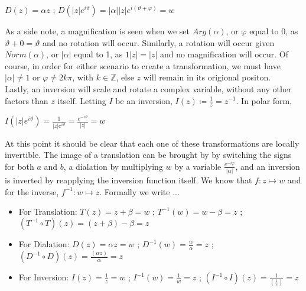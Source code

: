 \documentclass[a4paper,man,natbib]{apa6}
\newcommand{\Z}{\mathbb{Z}}  %
\begin{document}
\begin{center}

      $ D(z) = \alpha z $ ; $ D(|z|e^{i\vartheta}) = |\alpha ||z|e^{i(\vartheta + \varphi)} = w $ 

\end{center}

As a side note, a magnification is seen when we set $ Arg(\alpha) $, or $ \varphi $ equal to 0, as $ \vartheta + 0 = \vartheta $ and no rotation will occur.
Similarly, a rotation will occur given $ Norm(\alpha) $, or $ |\alpha| $ equal to 1, as $ 1|z| = |z| $ and no magnification will occur.
Of course, in order for either scenario to create a transformation, we must have $ |\alpha| \neq 1 $ or $ \varphi \neq 2k\pi $, with $ k \in \Z $, else $ z $ will remain in its origional positon.
\\
Lastly, an inversion will scale and rotate a complex variable, without any other factors than $ z $ itself.
Letting $ I $ be an inversion, $ I(z) \coloneqq \frac{1}{z} = z^{-1}$. In polar form, 

\begin{center}

      $ I(|z|e^{i\vartheta}) = \frac{1}{|z|e^{i\vartheta}} = \frac{e^{-i\vartheta}}{|z|} = w $ 

\end{center}

At this point it should be clear that each one of these transformations are locally invertible. 
The image of a translation can be brought by by switching the signs for both $ a $ and $ b $, 
a dialation by multiplying $ w $ by a variable $ \frac{e^{-i\varphi}}{|\alpha|} $, and an inversion is inverted by reapplying the inversion function itself.
We know that $ f : z \mapsto w $ and for the inverse, $  f^{-1}: w \mapsto z $. Formally we write ... 

\begin{itemize}

      \item For Translation: $ T(z) = z + \beta = w $ ; $ T^{-1}(w) = w - \beta = z $ ; $ (T^{-1} \circ  T)(z) = (z + \beta) - \beta = z  $
      
      \item For Dialation: $ D(z) = \alpha z = w $ ; $ D^{-1}(w) = \frac{w}{\alpha} = z $ ; $ (D^{-1} \circ  D)(z) = \frac{(\alpha z)}{\alpha} = z $
      
      \item For Inversion: $ I(z) = \frac{1}{z} = w $ ; $ I^{-1}(w) = \frac{1}{w} = z $ ; $ (I^{-1} \circ  I)(z) = \frac{1}{(\frac{1}{z})} = z $
      
\end{itemize}
\end{document}

